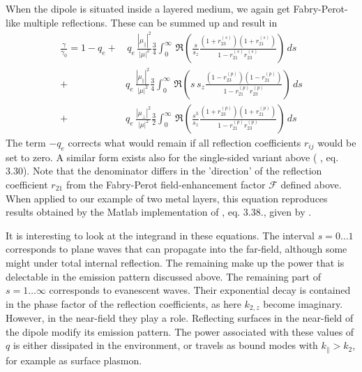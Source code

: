 When the dipole is situated inside a layered medium, we again get Fabry-Perot-like multiple reflections. These can be summed up and result in
\begin{align} 
\frac{\gamma}{\gamma_0} = 1 - q_e + & \, q_e \, \frac{| \mu_\parallel|^2}{|\mu|^2} \frac{3}{4}
\int_0^\infty \, \Re \left( 
\frac{s}{s_z} \frac{(1 + r_{23}^{(s)} ) (1 +  r_{21}^{(s)} ) }{1 -  r_{21}^{(s)}  r_{23}^{(s)} } 
\right) \, ds \label{eq:decay_double} \\
+ &q_e \, \frac{| \mu_\parallel|^2}{|\mu|^2} \frac{3}{4}
\int_0^\infty \, \Re  \left( 
s \, s_z \frac{(1 - r_{23}^{(p)} ) (1 -  r_{21}^{(p)} ) }{1 -  r_{21}^{(p)}  r_{23}^{(p)} } 
\right) \, ds \nonumber \\
+ & q_e \,\frac{| \mu_\perp|^2}{|\mu|^2} \frac{3}{2}
\int_0^\infty \, \Re \left( 
\frac{s^3}{s_z} \frac{(1 + r_{23}^{(p)} ) (1 +  r_{21}^{(p)} ) }{1 -  r_{21}^{(p)}  r_{23}^{(p)} } 
\right) \, ds  \nonumber  
\end{align}
The term $-q_e$ corrects what would remain if all reflection coefficients $r_{ij}$ would be set to zero. A similar form exists also for the single-sided variant above
(\cite{Ford_Weber_84} , eq. 3.30). Note that the denominator differs in the 'direction' of the reflection coefficient $r_{21}$ from the Fabry-Perot field-enhancement factor $\mathcal{F}$ defined above. When applied to our example of two metal layers, this equation reproduces results obtained by the Matlab implementation of \cite{Ford_Weber_84}, eq. 3.38., given by \cite{Jun10_thesis}.


It is interesting to look at the integrand in these equations. The interval $s = 0 \dots 1$ corresponds to plane waves that can propagate into the far-field, although some might under total internal reflection. The remaining make up the power that is delectable in the emission pattern discussed above. The remaining part of $s = 1 \dots \infty$ corresponds to evanescent waves. Their exponential decay is contained in the phase factor of the reflection coefficients, as here $k_{2,z}$ become imaginary. However, in the near-field they play a role. Reflecting surfaces in the near-field of the dipole modify its emission pattern. The power associated with these values of $q$ is either dissipated in the environment, or travels as bound modes with $k_\parallel > k_2$, for example as surface plasmon.




